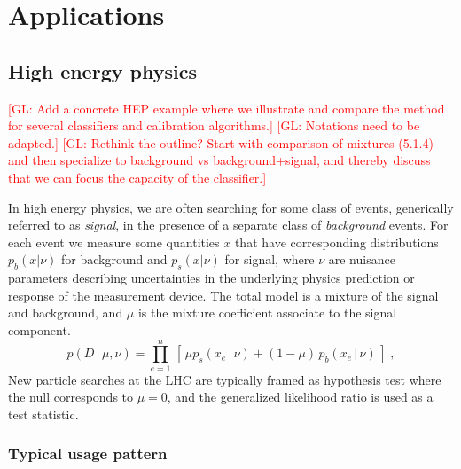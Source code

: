 \documentclass[12pt]{article}
\numberwithin{equation}{section}
\theoremstyle{plain}
\newcommand{\glnote}[1]{\textcolor{red}{[GL: #1]}}
\begin{document}

\section{Applications}

\subsection{High energy physics}

\glnote{Add a concrete HEP example where we illustrate and compare
the method for several classifiers and calibration algorithms.}
\glnote{Notations need to be adapted.}
\glnote{Rethink the outline? Start with comparison of mixtures (5.1.4) and then
specialize to background vs background+signal, and thereby discuss that we can
focus the capacity of the classifier.}

In high energy physics, we are often searching for some class of events,
generically referred to as \textit{signal}, in the presence of a separate class
of \textit{background} events.  For each event we measure some quantities $x$
that have corresponding distributions $p_b(x|\nu)$ for background and
$p_s(x|\nu)$ for signal, where $\nu$ are nuisance parameters describing
uncertainties in the underlying physics prediction or response of the
measurement device. The total model is a mixture of the signal and background,
and $\mu$ is the mixture coefficient associate to the signal component.
\begin{equation}\label{eq:hepGen}
p( D \,|\, \mu, \nu) = \prod_{e=1}^n \, \left[\, \mu p_s( x_e \, |\,  \nu)  + (1-\mu)\, p_b( x_e \,|\, \nu) \,\right] \; ,
\end{equation}
New particle searches at the LHC are typically framed as hypothesis test where
the null corresponds to $\mu=0$, and the generalized likelihood ratio is used as a test
statistic.

\subsubsection{Typical usage pattern}
\end{document}
